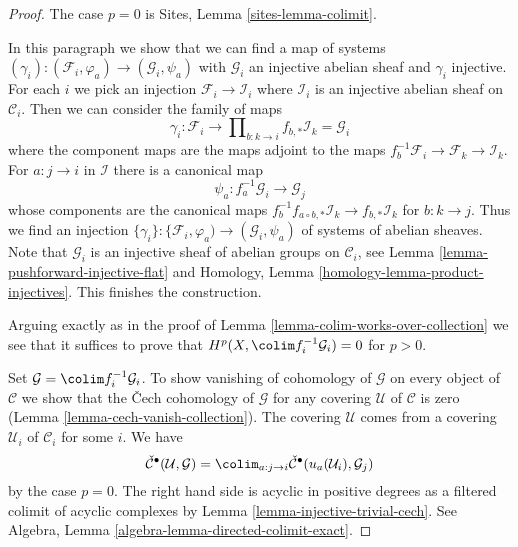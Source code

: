\begin{proof}
The case $p = 0$ is Sites, Lemma \ref{sites-lemma-colimit}.

\medskip\noindent
In this paragraph we show that we can find a map of systems
$(\gamma_i) : (\mathcal{F}_i, \varphi_a) \to (\mathcal{G}_i, \psi_a)$
with $\mathcal{G}_i$ an injective abelian sheaf and $\gamma_i$ injective.
For each $i$ we pick an injection $\mathcal{F}_i \to \mathcal{I}_i$
where $\mathcal{I}_i$ is an injective abelian sheaf on $\mathcal{C}_i$.
Then we can consider the family of maps
$$
\gamma_i :
\mathcal{F}_i
\longrightarrow
\prod\nolimits_{b : k \to i} f_{b, *}\mathcal{I}_k = \mathcal{G}_i
$$
where the component maps are the maps adjoint to the maps
$f_b^{-1}\mathcal{F}_i \to \mathcal{F}_k \to \mathcal{I}_k$.
For $a : j \to i$ in $\mathcal{I}$ there is a canonical map
$$
\psi_a : f_a^{-1}\mathcal{G}_i \to \mathcal{G}_j
$$
whose components are the canonical maps
$f_b^{-1}f_{a \circ b, *}\mathcal{I}_k \to f_{b, *}\mathcal{I}_k$
for $b : k \to j$. Thus we find an injection
$\{\gamma_i\} : \{\mathcal{F}_i, \varphi_a) \to (\mathcal{G}_i, \psi_a)$
of systems of abelian sheaves. Note that $\mathcal{G}_i$ is an injective
sheaf of abelian groups on $\mathcal{C}_i$, see
Lemma \ref{lemma-pushforward-injective-flat} and
Homology, Lemma \ref{homology-lemma-product-injectives}.
This finishes the construction.

\medskip\noindent
Arguing exactly as in the proof of
Lemma \ref{lemma-colim-works-over-collection}
we see that it suffices to prove that
$H^p(X, \colim f_i^{-1}\mathcal{G}_i) = 0$ for $p > 0$.

\medskip\noindent
Set $\mathcal{G} = \colim f_i^{-1}\mathcal{G}_i$.
To show vanishing of cohomology of $\mathcal{G}$ on every object
of $\mathcal{C}$ we show that the {\v C}ech cohomology of $\mathcal{G}$
for any covering $\mathcal{U}$ of $\mathcal{C}$ is zero
(Lemma \ref{lemma-cech-vanish-collection}).
The covering $\mathcal{U}$ comes from a covering
$\mathcal{U}_i$ of $\mathcal{C}_i$ for some $i$. We have
$$
\check{\mathcal{C}}^\bullet(\mathcal{U}, \mathcal{G}) =
\colim_{a : j \to i}
\check{\mathcal{C}}^\bullet(u_a(\mathcal{U}_i), \mathcal{G}_j)
$$
by the case $p = 0$. The right hand side is acyclic in positive degrees
as a filtered colimit of acyclic complexes by
Lemma \ref{lemma-injective-trivial-cech}. See
Algebra, Lemma \ref{algebra-lemma-directed-colimit-exact}.
\end{proof}















